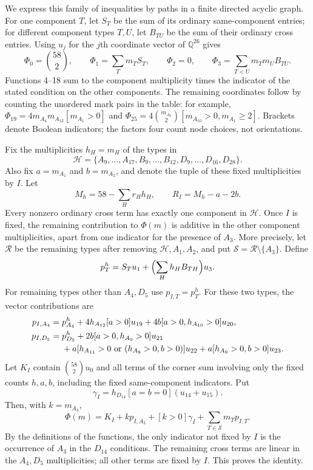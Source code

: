 \documentclass[11pt]{article}
\theoremstyle{definition}
\theoremstyle{remark}
\numberwithin{equation}{section}
\newcommand{\Q}{\mathbb Q}
\begin{document}
We express this family of inequalities by paths in a finite directed
acyclic graph.
For one component $T$, let $S_T$ be the sum of its ordinary
same-component entries; for different component types $T,U$, let
$B_{TU}$ be the sum of their ordinary cross entries. Using $u_j$
for the $j$th coordinate vector of $\Q^{26}$ gives
\begin{equation}\label{fv:first-aggregates}
 \Phi_0=\binom{58}{2},\qquad
 \Phi_1=\sum_Tm_TS_T,\qquad
 \Phi_2=0,\qquad
 \Phi_3=\sum_{T<U}m_Tm_UB_{TU}.
\end{equation}
Functions 4--18 sum to the component multiplicity times the indicator
of the stated condition on the other components. The remaining coordinates follow by counting the unordered
mark pairs in the table: for example,
$\Phi_{19}=4m_{A_4}m_{A_{12}}[m_{A_1}>0]$ and
$\Phi_{25}=4\binom{m_{A_2}}2[m_{A_{10}}>0,m_{A_1}\ge2]$.
Brackets denote Boolean indicators; the factors four count node choices,
not orientations.

Fix the multiplicities $h_H=m_H$ of the types in
\begin{equation}\label{fv:high-set}
 \mathcal H=\{A_9,\ldots,A_{17},B_9,\ldots,B_{12},
                    D_9,\ldots,D_{16},D_{28}\}.
\end{equation}
Also fix $a=m_{A_1}$ and $b=m_{A_2}$, and denote the tuple of these
fixed multiplicities by $I$. Let
\[
 M_h=58-\sum_Hr_Hh_H,\qquad R_I=M_h-a-2b.
\]
Every nonzero ordinary cross term has exactly one component in
$\mathcal H$. Once $I$ is fixed, the remaining contribution to
$\Phi(m)$ is additive in the other component multiplicities, apart
from one indicator for the presence of $A_3$. More precisely, let
$\mathcal R$ be the remaining types after removing
$\mathcal H,A_1,A_2$, and put
$\mathcal S=\mathcal R\setminus\{A_3\}$. Define
\[
 p_T^h=S_Tu_1+\Bigl(\sum_Hh_HB_{TH}\Bigr)u_3.
\]
For remaining types other than $A_4,D_5$ use $p_{I,T}=p_T^h$.
For these two types, the vector contributions are
\begin{align}
 p_{I,A_4}={}&p_{A_4}^h+4h_{A_{12}}[a>0]u_{19}
                    +4b[a>0,h_{A_{10}}>0]u_{20},\notag\\
 p_{I,D_5}={}&p_{D_5}^h+2b[a>0,h_{A_9}>0]u_{21}\notag\\
 &+a[h_{A_{11}}>0\text{ or }(h_{A_9}>0,b>0)]u_{22}
                    +a[h_{A_9}>0,b>0]u_{23}.
                    \label{fv:residual-costs}
\end{align}
Let $K_I$ contain $\binom{58}{2}u_0$ and all terms of the corner
sum involving only the fixed counts $h,a,b$, including the fixed
same-component indicators. Put
\[
              \gamma_I=h_{D_{14}}[a=b=0](u_{14}+u_{15}).
\]
Then, with $k=m_{A_3}$,
\begin{equation}\label{fv:vector-cost-identity}
 \Phi(m)=K_I+kp_{I,A_3}+[k>0]\gamma_I
                         +\sum_{T\in\mathcal S}m_Tp_{I,T}.
\end{equation}
By the definitions of the functions, the only indicator not fixed by
$I$ is the occurrence of $A_3$ in the $D_{14}$ conditions. The
remaining cross terms are linear in the $A_4,D_5$ multiplicities;
all other terms are fixed by $I$. This proves the identity.
\end{document}
